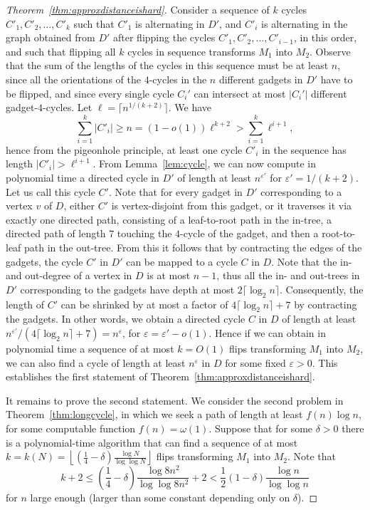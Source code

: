 \documentclass[runningheads]{llncs}
\begin{document}
\begin{proof}[Theorem~\ref{thm:approxdistanceishard}]
  Consider a sequence of $k$ cycles $C'_1,C'_2,\ldots ,C'_k$ such that $C'_1$ is alternating in $D'$, and $C'_i$ is alternating in the graph obtained from $D'$ after flipping the cycles $C'_1,C'_2,\ldots ,C'_{i-1}$, in this order, and such that flipping all $k$ cycles in sequence transforms $M_1$ into $M_2$.
  Observe that the sum of the lengths of the cycles in this sequence must be at least $n$, since all the orientations of the $4$-cycles in the $n$ different gadgets in $D'$ have to be flipped, and since every single cycle $C_i'$ can intersect at most $|C_i'|$ different gadget-$4$-cycles.
  Let $\ell = \lceil n^{1/(k+2)}\rceil$.
  We have
  $$
  \sum_{i=1}^k |C'_i|\geq n =(1-o(1))\ell^{k+2} > \sum_{i=1}^k \ell^{i+1},
  $$
  hence from the pigeonhole principle, at least one cycle $C'_i$ in the sequence has length $|C'_i|>\ell^{i+1}$.
  From Lemma~\ref{lem:cycle}, we can now compute in polynomial time a directed cycle in $D'$ of length at least $n^{\varepsilon'}$ for $\varepsilon' = 1/(k+2)$. Let us call this cycle $C'$.
  Note that for every gadget in $D'$ corresponding to a vertex $v$ of $D$, either $C'$ is vertex-disjoint from this gadget, or it traverses it via exactly one directed path, consisting of a leaf-to-root path in the in-tree, a directed path of length $7$ touching the $4$-cycle of the gadget, and then a root-to-leaf path in the out-tree. 
  From this it follows that by contracting the edges of the gadgets, the cycle $C'$ in $D'$ can be mapped to a cycle $C$ in $D$. Note that the in- and out-degree of a vertex in $D$ is at most $n-1$, thus all the in- and out-trees in $D'$ corresponding to the gadgets have depth at most $2\lceil\log_2 n\rceil$. Consequently, the length of $C'$ can be shrinked by at most a factor of $4\lceil\log_2 n\rceil+7$ by contracting the gadgets. In other words, we obtain a directed cycle $C$ in $D$ of length at least $n^{\varepsilon'}/(4\lceil\log_2 n\rceil+7) = n^{\varepsilon}$, for $\varepsilon = \varepsilon' - o(1)$.
  Hence if we can obtain in polynomial time a sequence of at most $k=O(1)$ flips transforming $M_1$ into $M_2$, we can also find a cycle of length at least $n^{\varepsilon}$ in $D$ for some fixed $\varepsilon>0$. This establishes the first statement of Theorem~\ref{thm:approxdistanceishard}. 

  It remains to prove the second statement. We consider the second problem in Theorem~\ref{thm:longcycle}, in which we seek a path of length at least $f(n)\log n$, for some computable function $f(n)=\omega (1)$. Suppose that for some $\delta>0$ there is a polynomial-time algorithm that can find a sequence of at most $k=k(N)=\left\lfloor\left(\frac{1}{4}-\delta\right) \frac{\log N}{\log\log N}\right\rfloor $ flips transforming $M_1$ into $M_2$. Note that  $$k+2 \le  \left(\frac{1}{4}-\delta\right) \frac{\log 8n^2}{\log\log 8n^2}+2 < \frac{1}{2}(1-\delta)\frac{\log n}{\log \log n}$$ for $n$ large enough (larger than some constant depending only on $\delta$). 
  

\end{proof}
\end{document}
